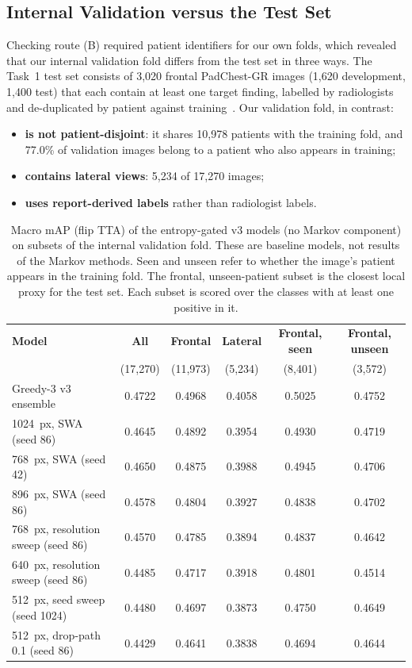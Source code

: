 \documentclass[conference]{IEEEtran}
\begin{document}
\subsection{Internal Validation versus the Test Set}
\label{sec:audit}
Checking route (B) required patient identifiers for our own folds, which revealed that our internal validation fold differs from the test set in three ways. The Task~1 test set consists of 3,020 frontal PadChest-GR images (1,620 development, 1,400 test) that each contain at least one target finding, labelled by radiologists and de-duplicated by patient against training~\cite{b14}. Our validation fold, in contrast:
\begin{itemize}
\item \textbf{is not patient-disjoint}: it shares 10,978 patients with the training fold, and 77.0\% of validation images belong to a patient who also appears in training;
\item \textbf{contains lateral views}: 5,234 of 17,270 images;
\item \textbf{uses report-derived labels} rather than radiologist labels.
\end{itemize}

\begin{table}[htbp]
\caption{Macro mAP (flip TTA) of the entropy-gated v3 models (no Markov component) on subsets of the internal validation fold. These are baseline models, not results of the Markov methods. Seen and unseen refer to whether the image's patient appears in the training fold. The frontal, unseen-patient subset is the closest local proxy for the test set. Each subset is scored over the classes with at least one positive in it.}
\begin{center}
\begin{tabular}{|l|c|c|c|c|c|}
\hline
\textbf{Model} & \textbf{All} & \textbf{Frontal} & \textbf{Lateral} & \textbf{Frontal, seen} & \textbf{Frontal, unseen} \\
 & (17,270) & (11,973) & (5,234) & (8,401) & (3,572) \\
\hline
Greedy-3 v3 ensemble & 0.4722 & 0.4968 & 0.4058 & 0.5025 & 0.4752 \\
\hline
1024~px, SWA (seed 86) & 0.4645 & 0.4892 & 0.3954 & 0.4930 & 0.4719 \\
\hline
768~px, SWA (seed 42) & 0.4650 & 0.4875 & 0.3988 & 0.4945 & 0.4706 \\
\hline
896~px, SWA (seed 86) & 0.4578 & 0.4804 & 0.3927 & 0.4838 & 0.4702 \\
\hline
768~px, resolution sweep (seed 86) & 0.4570 & 0.4785 & 0.3894 & 0.4837 & 0.4642 \\
\hline
640~px, resolution sweep (seed 86) & 0.4485 & 0.4717 & 0.3918 & 0.4801 & 0.4514 \\
\hline
512~px, seed sweep (seed 1024) & 0.4480 & 0.4697 & 0.3873 & 0.4750 & 0.4649 \\
\hline
512~px, drop-path 0.1 (seed 86) & 0.4429 & 0.4641 & 0.3838 & 0.4694 & 0.4644 \\
\hline
\end{tabular}
\label{tab:subsets}
\end{center}
\end{table}
\end{document}
